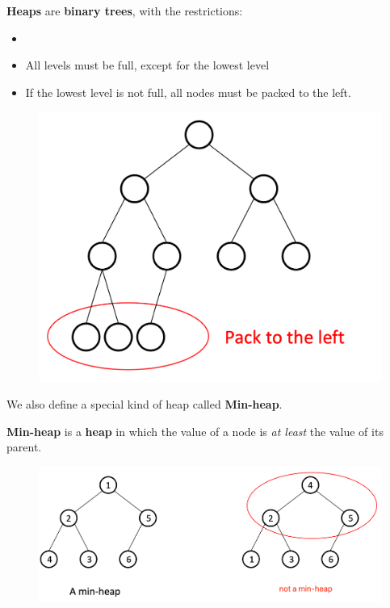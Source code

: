 \begin{spacing}{1.3}
    \newpage
    \begin{definition}
        {\bf Heaps} are {\bf binary trees}, with the restrictions:
        \begin{itemize}
            \item 
            \item All levels must be full, except for the lowest level
            \item If the lowest level is not full, all nodes must be packed to the left.
        \end{itemize}
    \end{definition}
    \begin{figure}[htbp]
        \centering
        \includegraphics[scale=0.38]{images/05-heap-intro.png}
    \end{figure}

    We also define a special kind of heap called {\bf Min-heap}.
    \begin{definition}
        {\bf Min-heap} is a {\bf heap} in which the value of a node 
        is {\it at least} the value of its parent.
    \end{definition}
    \begin{figure}[htbp]
        \centering
        \includegraphics[scale=0.4]{images/05-min-heap-intro.png}
    \end{figure}


\end{spacing}
